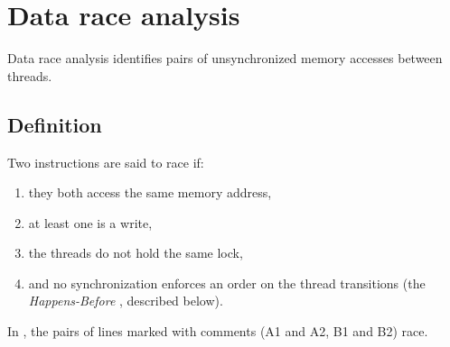 
\section{Data race analysis}
\label{sec:background-datarace}

Data race analysis \cite{eraser} identifies pairs of unsynchronized memory accesses between threads.

\subsection{Definition}

Two instructions are said to race if:
\begin{enumerate}
	\item they both access the same memory address,
	\item at least one is a write,
	\item the threads do not hold the same lock,
	\item and no synchronization enforces an order on the thread transitions
		(the {\em Happens-Before} , described below).
\end{enumerate}
In , the pairs of lines marked with comments (A1 and A2, B1 and B2) race.

